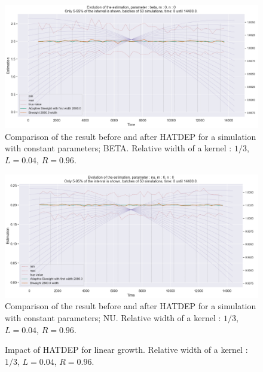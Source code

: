 \begin{figure}
\centering
\includegraphics[width = 0.90 \textwidth]{../imag/chap3/0/B.png}
\caption{Comparison of the result before and after HATDEP for a simulation with constant parameters; BETA. Relative width of a kernel : $1/3$, $L = 0.04$, $R = 0.96$.}
\label{fig:first_estimate_0_beta}
\end{figure}

\begin{figure}
\centering
\includegraphics[width = 0.90 \textwidth]{../imag/chap3/0/C.png}
\caption{Comparison of the result before and after HATDEP for a simulation with constant parameters; NU. Relative width of a kernel : $1/3$, $L = 0.04$, $R = 0.96$.}
\label{fig:first_estimate_0_nu}
\end{figure}









\begin{figure}
\centering
{} 
\caption{Impact of HATDEP for linear growth. Relative width of a kernel : $1/3$, $L = 0.04$, $R = 0.96$.}
\label{fig:compar_kernels_1}
\end{figure}

